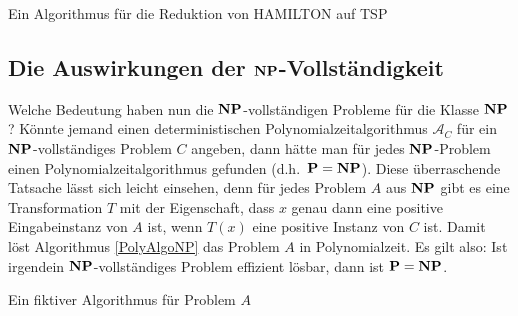 \begin{algorithm}[F]
\caption{Ein Algorithmus für die Reduktion von \textsf{HAMILTON} auf \textsf{TSP}}
\label{TSPRed}
\BlankLine
{}
\end{algorithm}

\subsection{Die Auswirkungen der $\mathbf{N}\mathbf{P}$-Vollständigkeit}
Welche Bedeutung haben nun die $\mathbf{N}\mathbf{P}$-vollständigen Probleme für die
Klasse $\mathbf{N}\mathbf{P}$? Könnte jemand einen deterministischen
Polynomialzeitalgorithmus $\mathcal{A}_C$ für ein
$\mathbf{N}\mathbf{P}$-voll\-ständiges Problem $C$ angeben, dann hätte man für jedes
$\mathbf{N}\mathbf{P}$-Problem einen Polynomialzeitalgorithmus gefunden
(d.h.~$\mathbf{P}=\mathbf{N}\mathbf{P}$). Diese überraschende Tatsache lässt sich leicht
einsehen, denn für jedes Problem $A$ aus $\mathbf{N}\mathbf{P}$ gibt es eine
Transformation $T$ mit der Eigenschaft, dass $x$ genau dann eine
positive Eingabeinstanz von $A$ ist, wenn $T(x)$ eine positive Instanz
von $C$ ist. Damit löst Algorithmus \ref{PolyAlgoNP} das Problem $A$
in Polynomialzeit. Es gilt also: Ist irgendein $\mathbf{N}\mathbf{P}$-vollständiges
Problem effizient lösbar, dann ist $\mathbf{P}=\mathbf{N}\mathbf{P}$.

\begin{algorithm}
\caption{Ein fiktiver Algorithmus für Problem $A$}
\label{PolyAlgoNP}
\BlankLine
{}
\end{algorithm}

